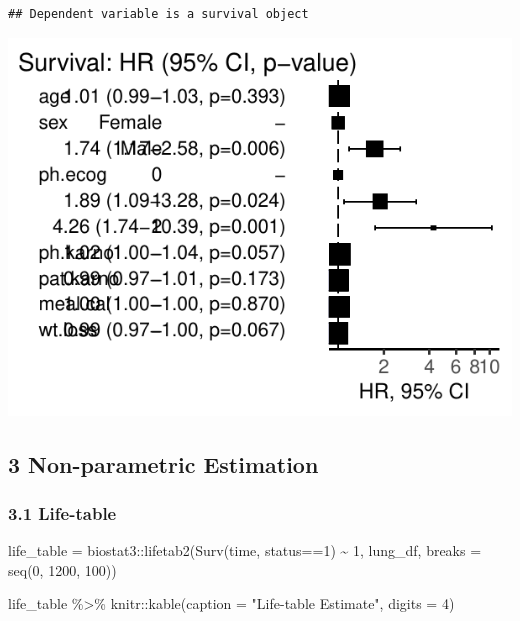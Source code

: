 \documentclass[
]{article}
\newenvironment{Shaded}{\begin{snugshade}}{\end{snugshade}}
\newcommand{\AttributeTok}[1]{\textcolor[rgb]{0.77,0.63,0.00}{#1}}
\newcommand{\DecValTok}[1]{\textcolor[rgb]{0.00,0.00,0.81}{#1}}
\newcommand{\FunctionTok}[1]{\textcolor[rgb]{0.00,0.00,0.00}{#1}}
\newcommand{\NormalTok}[1]{#1}
\newcommand{\OtherTok}[1]{\textcolor[rgb]{0.56,0.35,0.01}{#1}}
\newcommand{\SpecialCharTok}[1]{\textcolor[rgb]{0.00,0.00,0.00}{#1}}
\newcommand{\StringTok}[1]{\textcolor[rgb]{0.31,0.60,0.02}{#1}}
\begin{document}
\begin{verbatim}
## Dependent variable is a survival object
\end{verbatim}

\includegraphics{final_project_files/figure-latex/unnamed-chunk-8-1.pdf}

\hypertarget{non-parametric-estimation}{%
\subsection{3 Non-parametric
Estimation}\label{non-parametric-estimation}}

\hypertarget{life-table}{%
\subsubsection{3.1 Life-table}\label{life-table}}

\begin{Shaded}
\begin{Highlighting}[]
\NormalTok{life\_table }\OtherTok{=}\NormalTok{ biostat3}\SpecialCharTok{::}\FunctionTok{lifetab2}\NormalTok{(}\FunctionTok{Surv}\NormalTok{(time, status}\SpecialCharTok{==}\DecValTok{1}\NormalTok{) }\SpecialCharTok{\textasciitilde{}} \DecValTok{1}\NormalTok{, lung\_df, }\AttributeTok{breaks =} \FunctionTok{seq}\NormalTok{(}\DecValTok{0}\NormalTok{, }\DecValTok{1200}\NormalTok{, }\DecValTok{100}\NormalTok{))}

\NormalTok{life\_table }\SpecialCharTok{\%\textgreater{}\%}
\NormalTok{  knitr}\SpecialCharTok{::}\FunctionTok{kable}\NormalTok{(}\AttributeTok{caption =} \StringTok{"Life{-}table Estimate"}\NormalTok{,}
               \AttributeTok{digits =} \DecValTok{4}\NormalTok{)}
\end{Highlighting}
\end{Shaded}
\end{document}
